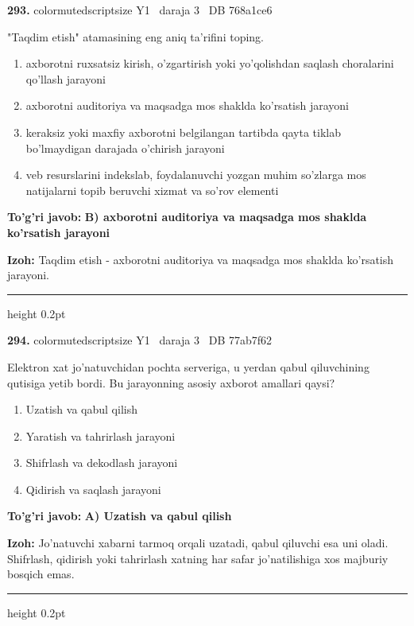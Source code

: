 \documentclass[10pt,a4paper,oneside]{article}
\begin{document}
\noindent\textbf{\color{ink}293.}  {color{muted}scriptsize Y1 \textbullet\ daraja 3 \textbullet\ DB 768a1ce6}
\par
"Taqdim etish" atamasining eng aniq ta'rifini toping.
\begin{enumerate}[label=\Alph*),leftmargin=9mm]
\item axborotni ruxsatsiz kirish, o'zgartirish yoki yo'qolishdan saqlash choralarini qo'llash jarayoni
\item axborotni auditoriya va maqsadga mos shaklda ko'rsatish jarayoni
\item keraksiz yoki maxfiy axborotni belgilangan tartibda qayta tiklab bo'lmaydigan darajada o'chirish jarayoni
\item veb resurslarini indekslab, foydalanuvchi yozgan muhim so'zlarga mos natijalarni topib beruvchi xizmat va so'rov elementi
\end{enumerate}
\begin{tcolorbox}[enhanced,breakable,colback=teal!4,colframe=teal!50!black,boxrule=0.5pt,arc=1.1mm,left=3mm,right=3mm,top=1.7mm,bottom=1.7mm,before skip=2mm,after skip=2mm]
\textbf{\color{teal}To'g'ri javob:} \textbf{B) axborotni auditoriya va maqsadga mos shaklda ko'rsatish jarayoni}
\par\smallskip
\textbf{Izoh:} Taqdim etish - axborotni auditoriya va maqsadga mos shaklda ko'rsatish jarayoni.
\end{tcolorbox}
\vspace{2mm}\hrule height 0.2pt \vspace{3mm}

\noindent\textbf{\color{ink}294.}  {color{muted}scriptsize Y1 \textbullet\ daraja 3 \textbullet\ DB 77ab7f62}
\par
Elektron xat jo'natuvchidan pochta serveriga, u yerdan qabul qiluvchining qutisiga yetib bordi. Bu jarayonning asosiy axborot amallari qaysi?
\begin{enumerate}[label=\Alph*),leftmargin=9mm]
\item Uzatish va qabul qilish
\item Yaratish va tahrirlash jarayoni
\item Shifrlash va dekodlash jarayoni
\item Qidirish va saqlash jarayoni
\end{enumerate}
\begin{tcolorbox}[enhanced,breakable,colback=teal!4,colframe=teal!50!black,boxrule=0.5pt,arc=1.1mm,left=3mm,right=3mm,top=1.7mm,bottom=1.7mm,before skip=2mm,after skip=2mm]
\textbf{\color{teal}To'g'ri javob:} \textbf{A) Uzatish va qabul qilish}
\par\smallskip
\textbf{Izoh:} Jo'natuvchi xabarni tarmoq orqali uzatadi, qabul qiluvchi esa uni oladi. Shifrlash, qidirish yoki tahrirlash xatning har safar jo'natilishiga xos majburiy bosqich emas.
\end{tcolorbox}
\vspace{2mm}\hrule height 0.2pt \vspace{3mm}
\end{document}
